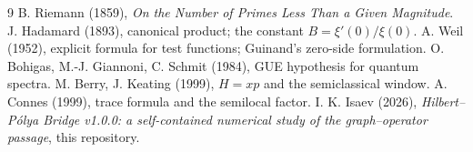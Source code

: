 \documentclass[11pt]{article}
\theoremstyle{definition}
\begin{document}
\begin{thebibliography}{9}
 B. Riemann (1859), \emph{On the Number of Primes
Less Than a Given Magnitude}.
 J. Hadamard (1893), canonical product;
the constant $B = \xi'(0)/\xi(0)$.
 A. Weil (1952), explicit formula for test functions;
Guinand's zero-side formulation.
 O. Bohigas, M.-J. Giannoni, C. Schmit (1984), GUE
hypothesis for quantum spectra.
 M. Berry, J. Keating (1999), $H = xp$ and the
semiclassical window.
 A. Connes (1999), trace formula and the
semilocal factor.
 I. K. Isaev (2026), \emph{Hilbert--P\'olya Bridge v1.0.0:
a self-contained numerical study of the graph--operator passage},
this repository.
\end{thebibliography}
\end{document}
